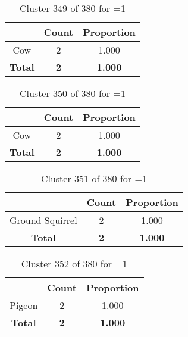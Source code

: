 \begin{table}[ht!]
\centering
\begin{tabular}{|c|c|c|}
\hline
\bf \Spec{} &\bf Count &\bf Proportion\\ \hline \hline
Cow & 2 & 1.000\\ \hline
\hline
\bf Total & \bf 2 & \bf 1.000\\ \hline
\end{tabular}
\label{tab:cluster:349:1}
\caption{Cluster 349 of 380 for \minneigh{}=1}
\end{table}

\clearpage
\begin{table}[ht!]
\centering
\begin{tabular}{|c|c|c|}
\hline
\bf \Spec{} &\bf Count &\bf Proportion\\ \hline \hline
Cow & 2 & 1.000\\ \hline
\hline
\bf Total & \bf 2 & \bf 1.000\\ \hline
\end{tabular}
\label{tab:cluster:350:1}
\caption{Cluster 350 of 380 for \minneigh{}=1}
\end{table}

\begin{table}[ht!]
\centering
\begin{tabular}{|c|c|c|}
\hline
\bf \Spec{} &\bf Count &\bf Proportion\\ \hline \hline
Ground Squirrel & 2 & 1.000\\ \hline
\hline
\bf Total & \bf 2 & \bf 1.000\\ \hline
\end{tabular}
\label{tab:cluster:351:1}
\caption{Cluster 351 of 380 for \minneigh{}=1}
\end{table}

\begin{table}[ht!]
\centering
\begin{tabular}{|c|c|c|}
\hline
\bf \Spec{} &\bf Count &\bf Proportion\\ \hline \hline
Pigeon & 2 & 1.000\\ \hline
\hline
\bf Total & \bf 2 & \bf 1.000\\ \hline
\end{tabular}
\label{tab:cluster:352:1}
\caption{Cluster 352 of 380 for \minneigh{}=1}
\end{table}

